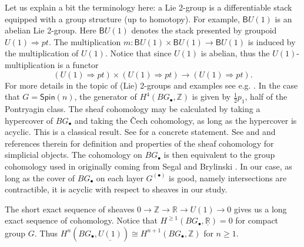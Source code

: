\documentclass[letterpaper,10pt, oneside]{article} %
\newcommand{\Spin}{\mathsf{Spin}}%
\newcommand{\B}{\mathsf{B}}%
\newcommand{\R}{\mathbb R}\newcommand{\Z}{\mathbb Z}
\newcommand{\half}{\frac{1}{2}}
\begin{document}
Let us explain a bit the terminology here: a
Lie 2-group is a differentiable stack equipped with a
group structure (up to homotopy). For example, $\B U(1)$ is an abelian
Lie 2-group. Here $\B U(1)$ denotes the stack presented by groupoid
$U(1) \Rightarrow pt$. The multiplication $m: \B U(1) \times \B U(1)
\to \B U(1)$ is induced by the multiplication of $U(1)$. Notice that
since $U(1)$ is abelian, thus the $U(1)$-multiplication is a functor
\[
(U(1) \Rightarrow pt) \times (U(1) \Rightarrow pt) \longrightarrow
(U(1) \Rightarrow pt).
\]
For more details in the topic of (Lie) 2-groups and examples see e.g. \cite{baez:2group}\cite[Sect 3.1]{bnz}. In the case that $G=\Spin(n)$, the generator of $H^4(BG_\bullet, \Z)$ is given by $\half p_1$, half
of the Pontryagin class. The sheaf cohomology may be calculated by taking a
hypercover of $BG_\bullet$ and taking the \v{C}ech cohomology, as long as the
hypercover is acyclic. This is a classical result. See \cite[Proposition 2.4]{wz:int} for a concrete
statement. See \cite{friedlander} and \cite[Sect. 2]{wz:int} and references therein for definition and properties of the sheaf cohomology for simplicial objects. The cohomology on $BG_\bullet$ is then equivalent to the group cohomology used in \cite{schommer-pries:string} originally coming from Segal and Brylinski \cite{Seg70, Seg75, Bry00}.  In our case, as long as
the cover of $BG_\bullet$ on each layer $G^{(\bullet)}$ is good, namely intersections are contractible, it is acyclic with respect to sheaves in our study.

The short exact sequence of sheaves $0\to \Z \to \R\to U(1)\to 0$ gives us a long exact sequence of cohomology. Notice that $H^{\ge 1} (BG_\bullet, \underline{\R})=0$ for compact group $G$. Thus $H^{n}(BG_\bullet, \underline{U(1)})\cong H^{n+1}(BG_\bullet, \Z)$ for $n\ge 1$.
\end{document}
